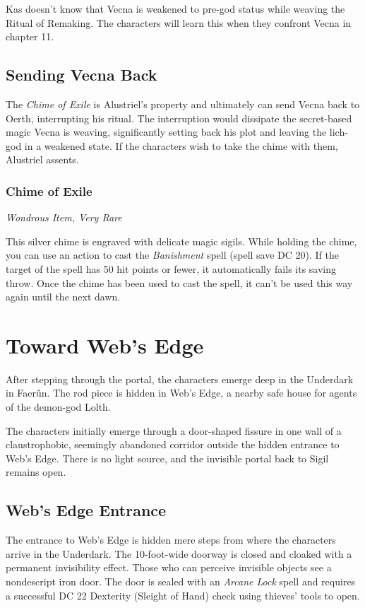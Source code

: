 \documentclass[10pt,a4paper,twoside,bg=print,twocolumn,openany,nodeprecatedcode]{dndbook}
\begin{document}
Kas doesn't know that Vecna is weakened to pre-god status while weaving the Ritual of Remaking. The characters will learn this when they confront Vecna in chapter 11.

\subsection{Sending Vecna Back}
The \textit{Chime of Exile} is Alustriel's property and ultimately can send Vecna back to Oerth, interrupting his ritual. The interruption would dissipate the secret-based magic Vecna is weaving, significantly setting back his plot and leaving the lich-god in a weakened state. If the characters wish to take the chime with them, Alustriel assents.

\subsubsection{Chime of Exile}
\textit{Wondrous Item, Very Rare}

This silver chime is engraved with delicate magic sigils. While holding the chime, you can use an action to cast the \textit{Banishment} spell (spell save DC 20). If the target of the spell has 50 hit points or fewer, it automatically fails its saving throw. Once the chime has been used to cast the spell, it can't be used this way again until the next dawn.

\section{Toward Web's Edge}
After stepping through the portal, the characters emerge deep in the Underdark in Faerûn. The rod piece is hidden in Web's Edge, a nearby safe house for agents of the demon-god Lolth.

The characters initially emerge through a door-shaped fissure in one wall of a claustrophobic, seemingly abandoned corridor outside the hidden entrance to Web's Edge. There is no light source, and the invisible portal back to Sigil remains open.

\subsection{Web's Edge Entrance}
The entrance to Web's Edge is hidden mere steps from where the characters arrive in the Underdark. The 10-foot-wide doorway is closed and cloaked with a permanent invisibility effect. Those who can perceive invisible objects see a nondescript iron door. The door is sealed with an \textit{Arcane Lock} spell and requires a successful DC 22 Dexterity (Sleight of Hand) check using thieves' tools to open.
\end{document}
